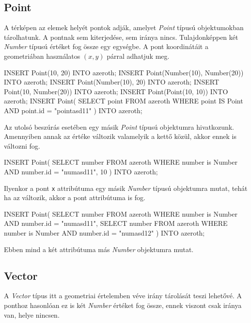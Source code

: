 \subsection{Point}

A térképen az elemek helyét pontok adják, amelyet \textit{Point} típusú objektumokban tárolhatunk. A pontnak sem kiterjedése, sem iránya nincs. Tulajdonképpen két \textit{Number} típusú értéket fog össze egy egységbe. A pont koordinátáit a geometriában használatos $(x, y)$ párral adhatjuk meg.

\begin{sql}
INSERT Point(10, 20) INTO azeroth;
INSERT Point(Number(10), Number(20)) INTO azeroth;
INSERT Point(Number(10), 20) INTO azeroth;
INSERT Point(10, Number(20)) INTO azeroth;
INSERT Point(Point(10, 10)) INTO azeroth;
INSERT Point(
    SELECT point FROM azeroth
    WHERE point IS Point AND point.id = "pointasd11"
) INTO azeroth;
\end{sql}

Az utolsó beszúrás esetében egy másik \textit{Point} típusú objektumra hivatkozunk. Amennyiben annak az értéke változik valamelyik a kettő közül, akkor ennek is változni fog.

\begin{sql}
INSERT Point(
    SELECT number FROM azeroth
    WHERE number is Number AND number.id = "numasd11", 10
) INTO azeroth;
\end{sql}

Ilyenkor a pont \texttt{x} attribútuma egy másik \textit{Number} típusú objektumra mutat, tehát ha az változik, akkor a pont attribútuma is fog.

\begin{sql}
INSERT Point(
    SELECT number FROM azeroth
    WHERE number is Number AND number.id = "numasd11",
    SELECT number FROM azeroth
    WHERE number is Number AND number.id = "numasd12"
) INTO azeroth;
\end{sql}

Ebben mind a két attribútuma más \textit{Number} objektumra mutat.

\subsection{Vector}

A \textit{Vector} típus itt a geometriai értelemben véve irány tárolását teszi lehetővé. A ponthoz hasonlóan ez is két \textit{Number} értéket fog össze, ennek viszont csak iránya van, helye nincsen.


